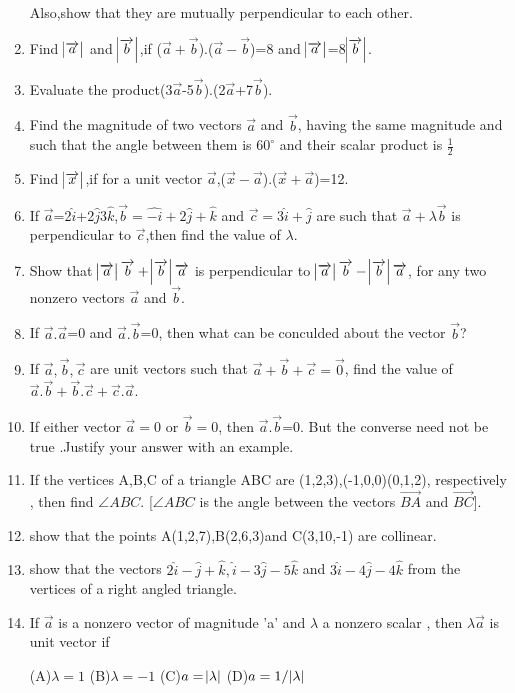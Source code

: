 \documentclass[12pt]{article}
\begin{document}
\begin{enumerate}
Also,show that they are mutually perpendicular to each other.
\item Find $\abs{\overrightarrow {a}}$ and $\abs{\overrightarrow {b}}$,if ($\overrightarrow {a}+\overrightarrow {b}$).($\overrightarrow {a}-\overrightarrow {b}$)=8 and $\abs{\overrightarrow {a}}$=8$\abs{\overrightarrow {b}}$.
\item Evaluate the product(3$\overrightarrow {a}$-5$\overrightarrow {b}$).(2$\overrightarrow {a}$+7$\overrightarrow {b}$).
\item Find the magnitude of two vectors $\overrightarrow {a}$ and $\overrightarrow {b}$, having the same magnitude and such that the angle between them is $60^\circ$ and their scalar product is $\frac{1}{2}$
\item Find $\abs{\overrightarrow {x}}$,if for a unit vector $\overrightarrow {a}$,($\overrightarrow {x}-\overrightarrow {a}$).($\overrightarrow {x}+\overrightarrow {a}$)=12.
\item If $\overrightarrow {a}$=2$\hat{i}$+2$\hat{j}$3$\hat{k}$,$\overrightarrow {b}=\hat{-i}+2\hat{j}+\hat{k}$ and $\overrightarrow {c}=3\hat{i}+\hat{j}$ are such that $\overrightarrow {a}+\lambda\overrightarrow {b}$ is perpendicular to $\overrightarrow {c}$,then find the value of $\lambda$.
\item Show that $\abs {\overrightarrow {a}}\overrightarrow {b}+\abs{\overrightarrow {b}}\overrightarrow {a}$ is perpendicular to $\abs{\overrightarrow {a}} \overrightarrow {b}-\abs{\overrightarrow {b}} \overrightarrow {a}$, for any two nonzero vectors $\overrightarrow {a}$ and $\overrightarrow {b}$.
\item If $\overrightarrow {a}.\overrightarrow {a}$=0 and $\overrightarrow {a}.\overrightarrow {b}$=0, then what can be conculded about the vector $\overrightarrow {b}$?
\item If $\overrightarrow {a},\overrightarrow {b},\overrightarrow {c}$ are unit vectors such that $\overrightarrow {a}+\overrightarrow {b}+\overrightarrow {c}=\overrightarrow {0}$, find the value of $\overrightarrow {a}.\overrightarrow {b}+\overrightarrow {b}.\overrightarrow {c}+\overrightarrow {c}.\overrightarrow {a}$.
\item If either vector $\overrightarrow {a}=0$ or $\overrightarrow {b}=0$, then $\overrightarrow {a}.\overrightarrow {b}$=0. But the converse need not be true .Justify your answer with an example.
\item If the vertices A,B,C of a triangle ABC are (1,2,3),(-1,0,0)(0,1,2), respectively , then find  $\angle{ABC}$. [$\angle{ABC}$ is the angle between the vectors $\overrightarrow{BA}$ and $\overrightarrow{BC}$].
\item show that the points A(1,2,7),B(2,6,3)and C(3,10,-1) are collinear.
\item show that the vectors $2\hat{i}-\hat{j}+\hat{k},\hat{i}-3\hat{j}-5\hat{k}$ and  $3\hat{i}-4\hat{j}-4\hat{k}$ from the vertices of a right angled triangle.
\item If $\overrightarrow {a}$ is a nonzero vector of magnitude 'a' and $\lambda$ a nonzero scalar , then $\lambda\overrightarrow {a}$ is unit vector if
 
 (A)$\lambda=1$ (B)$\lambda=-1$  (C)$a=\abs{\lambda}$  (D)$a=1/\abs{\lambda}$  

\end{enumerate}
\end{document}
